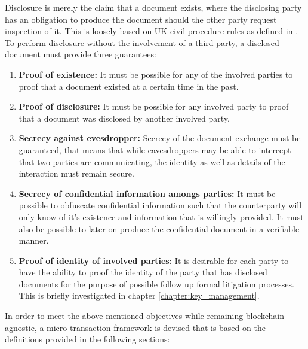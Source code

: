 \documentclass[12pt,msc,a4paper,oneside]{ucl_thesis}
\begin{document}
Disclosure is merely the claim that a document exists, where the disclosing party has an obligation to produce the document should the other party request inspection of it. This is loosely based on UK civil procedure rules as defined in \cite{justice_gov:civil_procedure_rules}. To perform disclosure without the involvement of a third party, a disclosed document must provide three guarantees:
\begin{enumerate}
    \item{\textbf{Proof of existence:}} It must be possible for any of the involved parties to proof that a document existed at a certain time in the past. \label{itm:disclosure_document_objectives_existence}

    \item{\textbf{Proof of disclosure:}} It must be possible for any involved party to proof that a document was disclosed by another involved party. \label{itm:disclosure_document_objectives_disclosure}

    \item{\textbf{Secrecy against evesdropper:}} Secrecy of the document exchange must be guaranteed, that means that while eavesdroppers may be able to intercept that two parties are communicating, the identity as well as details of the interaction must remain secure. \label{itm:disclosure_document_objectives_evesdrop}

    \item{\textbf{Secrecy of confidential information amongs parties:}} It must be possible to obfuscate confidential information such that the counterparty will only know of it's existence and information that is willingly provided. It must also be possible to later on produce the confidential document in a verifiable manner. \label{itm:disclosure_document_objectives_confidential}

    \item{\textbf{Proof of identity of involved parties:}} It is desirable for each party to have the ability to proof the identity of the party that has disclosed documents for the purpose of possible follow up formal litigation processes. This is briefly investigated in chapter \ref{chapter:key_management}. 
\end{enumerate}
In order to meet the above mentioned objectives while remaining blockchain agnostic, a micro transaction framework is devised that is based on the definitions provided in the following sections:
\end{document}
